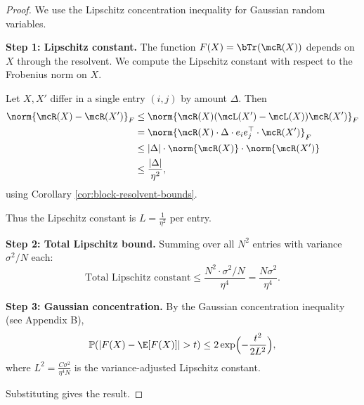 \begin{proof}
We use the Lipschitz concentration inequality for Gaussian random variables.

\textbf{Step 1: Lipschitz constant.} The function $F(X) = \bTr(\mcR(X))$ depends on $X$ through the resolvent. We compute the Lipschitz constant with respect to the Frobenius norm on $X$.

Let $X, X'$ differ in a single entry $(i, j)$ by amount $\Delta$. Then
\begin{align}
\norm{\mcR(X) - \mcR(X')}_F
&\leq \norm{\mcR(X)(\mcL(X') - \mcL(X))\mcR(X')}_F \\
&= \norm{\mcR(X) \cdot \Delta \cdot e_i e_j^\top \cdot \mcR(X')}_F \\
&\leq |\Delta| \cdot \norm{\mcR(X)} \cdot \norm{\mcR(X')} \\
&\leq \frac{|\Delta|}{\eta^2},
\end{align}
using Corollary \ref{cor:block-resolvent-bounds}.

Thus the Lipschitz constant is $L = \frac{1}{\eta^2}$ per entry.

\textbf{Step 2: Total Lipschitz bound.} Summing over all $N^2$ entries with variance $\sigma^2/N$ each:
\[
\text{Total Lipschitz constant} \leq \frac{N^2 \cdot \sigma^2/N}{\eta^4} = \frac{N\sigma^2}{\eta^4}.
\]

\textbf{Step 3: Gaussian concentration.} By the Gaussian concentration inequality (see Appendix B),
\[
\mathbb{P}(|F(X) - \E[F(X)]| > t) \leq 2\exp\Bigl(-\frac{t^2}{2L^2}\Bigr),
\]
where $L^2 = \frac{C \sigma^2}{\eta^4 N}$ is the variance-adjusted Lipschitz constant.

Substituting gives the result.
\end{proof}
